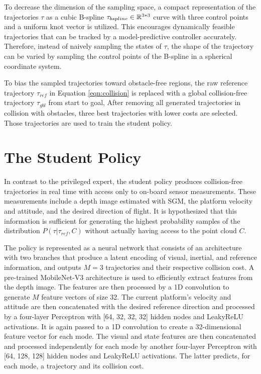 To decrease the dimension of the sampling space, a compact representation of the trajectories $\tau$ as a cubic B-spline $\tau_{bspline} \in \mathbb{R}^{3*3}$ curve with three control points and a uniform knot vector is utilized. This encourages dynamically feasible trajectories that can be tracked by a model-predictive controller accurately. Therefore, instead of naively sampling the states of $\tau$, the shape of the trajectory can be varied by sampling the control points of the B-spline in a spherical coordinate system.

To bias the sampled trajectories toward obstacle-free regions, the raw reference trajectory $\tau_{ref}$ in Equation \ref{eqn:collision} is replaced with a global collision-free trajectory $\tau_{gbl}$ from start to goal, After removing all generated trajectories in collision with obstacles, three best trajectories with
lower costs are selected. Those trajectories are used to train the student policy.


\section{The Student Policy}
In contrast to the privileged expert, the student policy produces collision-free trajectories in real time with access only to on-board sensor measurements. These measurements include a depth image estimated with SGM, the platform velocity and attitude, and the desired direction of flight. It is hypothesized that this information is sufficient for generating the highest probability samples of the distribution $P(\tau | \tau_{ref}, C)$ without actually having access to the point cloud $C$.

The policy is represented as a neural network that consists of an architecture with two branches that produce a latent encoding of visual,
inertial, and reference information, and outputs $M = 3$ trajectories and their respective collision cost. A pre-trained MobileNet-V3 \cite{MobileNet} architecture is used to efficiently extract features from the depth image. The features are then processed by a 1D convolution to generate $M$ feature vectors of size 32. The current platform’s velocity and attitude are then concatenated with the desired reference direction and processed by a four-layer Perceptron with [64, 32, 32, 32] hidden
nodes and LeakyReLU activations. It is again passed to a 1D convolution to create a 32-dimensional feature vector for each mode. The visual and state features are then concatenated and processed independently for each mode by another four-layer Perceptron with [64, 128, 128] hidden nodes and LeakyReLU activations. The latter predicts, for each mode, a trajectory and its collision cost. 

